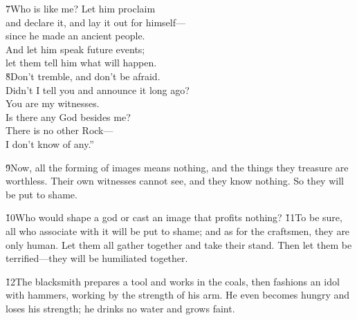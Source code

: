 \begin{poetry}
\poeml \v{7}Who is like me? Let him proclaim \\
\poemll    and declare it, and lay it out for himself--- \\
\poeml since he made an ancient people. \\
\poemll    And let him speak future events; \\
\poemlll       let them tell him what will happen. \\
\poeml \v{8}Don't tremble, and don't be afraid. \\
\poemll    Didn't I tell you and announce it long ago? \\
\poeml You are my witnesses. \\
\poemll    Is there any God besides me? \\
\poeml There is no other Rock--- \\
\poemll    I don't know of any.''
\end{poetry}

\v{9}Now, all the forming of images means nothing, and the things they treasure are worthless. Their own witnesses cannot see, and they know nothing. So they will be put to shame.

\v{10}Who would shape a god or cast an image that profits nothing? \v{11}To be sure, all who associate with it will be put to shame; and as for the craftsmen, they are only human. Let them all gather together and take their stand. Then let them be terrified---they will be humiliated together.

\v{12}The blacksmith prepares a tool and works in the coals, then fashions an idol with hammers, working by the strength of his arm. He even becomes hungry and loses his strength; he drinks no water and grows faint.

